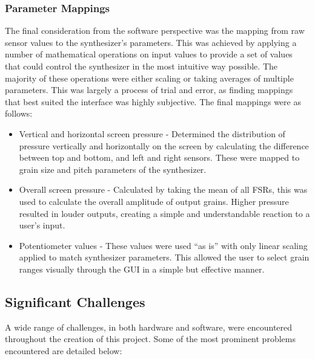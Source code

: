 \documentclass[titlepage]{scrartcl}
\begin{document}
\subsubsection{Parameter Mappings}
The final consideration from the software perspective was the mapping from raw
sensor values to the synthesizer's parameters. This was achieved by applying a
number of mathematical operations on input values to provide a set of values
that could control the synthesizer in the most intuitive way possible. The
majority of these operations were either scaling or taking averages of multiple
parameters. This was largely a process of trial and error, as finding mappings
that best suited the interface was highly subjective. The final mappings were
as follows:
\begin{itemize}
    \item Vertical and horizontal screen pressure - Determined the distribution
        of pressure vertically and horizontally on the screen by calculating
        the difference between top and bottom, and left and right sensors.
        These were mapped to grain size and pitch parameters of the
        synthesizer.
    \item Overall screen pressure - Calculated by taking the mean of all FSRs,
        this was used to calculate the overall amplitude of output grains.
        Higher pressure resulted in louder outputs, creating a simple and
        understandable reaction to a user's input.
    \item Potentiometer values - These values were used ``as is'' with only
        linear scaling applied to match synthesizer parameters. This allowed
        the user to select grain ranges visually through the GUI in a simple
        but effective manner.
\end{itemize}

\subsection{Significant Challenges}
A wide range of challenges, in both hardware and software, were encountered
throughout the creation of this project. Some of the most prominent problems
encountered are detailed below:
\end{document}
